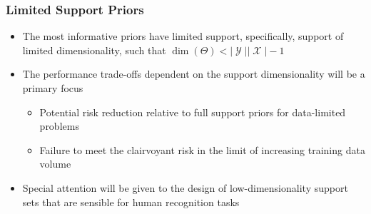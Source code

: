 \documentclass[aspectratio=169,usenames,dvipsnames]{beamer}
\DeclareMathOperator{\Xcal}{\mathcal{X}}
\DeclareMathOperator{\Ycal}{\mathcal{Y}}
\begin{document}
\begin{frame}
\frametitle{Limited Support Priors}

\begin{itemize}
\item The most informative priors have limited support, specifically, support of \alert{limited dimensionality}, such that $\dim(\Theta) < |\Ycal||\Xcal| - 1$
\vspace{0.5em}
\item The performance trade-offs dependent on the support dimensionality will be a primary focus
	\vspace{0.25em}
	\begin{itemize}
	\item Potential risk reduction relative to full support priors for data-limited problems
	\vspace{0.25em}
	\item Failure to meet the clairvoyant risk in the limit of increasing training data volume
	\end{itemize}
\vspace{0.5em}
\item Special attention will be given to the design of low-dimensionality support sets that are sensible for human recognition tasks
\end{itemize}

\vspace{1em}
\centering
{}

\end{frame}
\end{document}
